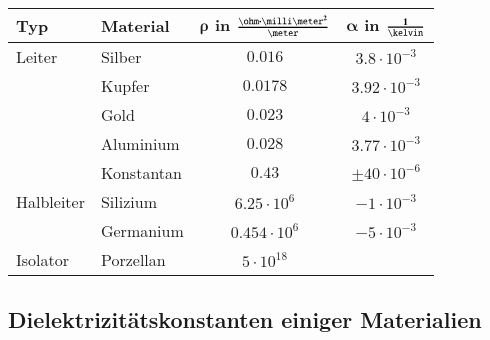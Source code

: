 \begin{center}
    \begin{tabular}{ l | l  c  c }
        \toprule
        \textbf{Typ}        & \textbf{Material}     & $\bm{\rho}$ \textbf{in} $\bm{\frac{\ohm \cdot \milli \meter^2}{\meter}}$  & $\bm{\alpha}$ \textbf{in} $\bm{\frac{1}{\kelvin}}$    \\
        \midrule
        Leiter              & Silber                & $0.016$                                                                   & $3.8 \cdot 10^{-3}$                                   \\
        \midrule
                            & Kupfer                & $0.0178$                                                                  & $3.92 \cdot 10^{-3}$                                  \\
        \midrule            
                            & Gold                  & $0.023$                                                                   & $4 \cdot 10^{-3}$                                     \\
        \midrule            
                            & Aluminium             & $0.028$                                                                   & $3.77 \cdot 10^{-3}$                                  \\
        \midrule
                            & Konstantan            & $0.43$                                                                    & $\pm 40 \cdot 10^{-6}$                                \\  
        \midrule
        Halbleiter          & Silizium              & $6.25 \cdot 10^6$                                                         & $- 1 \cdot 10^{-3}$                                   \\
        \midrule
                            & Germanium             & $0.454 \cdot 10^6$                                                        & $- 5 \cdot 10^{-3}$                                   \\
        \midrule        
        Isolator            & Porzellan             & $5 \cdot 10^{18}$                                                         &                                                       \\
        \bottomrule               
    \end{tabular}
\end{center}


\subsection{Dielektrizitätskonstanten einiger Materialien}

